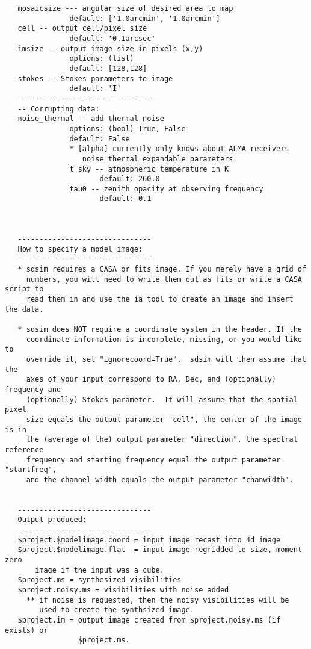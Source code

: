 \begin{verbatim}
   mosaicsize --- angular size of desired area to map
               default: ['1.0arcmin', '1.0arcmin']
   cell -- output cell/pixel size
               default: '0.1arcsec'
   imsize -- output image size in pixels (x,y)
               options: (list)
               default: [128,128]
   stokes -- Stokes parameters to image
               default: 'I'
   -------------------------------
   -- Corrupting data:
   noise_thermal -- add thermal noise 
               options: (bool) True, False
               default: False
               * [alpha] currently only knows about ALMA receivers 
                  noise_thermal expandable parameters
               t_sky -- atmospheric temperature in K 
                      default: 260.0
               tau0 -- zenith opacity at observing frequency
                      default: 0.1



   -------------------------------
   How to specify a model image:
   -------------------------------
   * sdsim requires a CASA or fits image. If you merely have a grid of 
     numbers, you will need to write them out as fits or write a CASA script to
     read them in and use the ia tool to create an image and insert the data.

   * sdsim does NOT require a coordinate system in the header. If the
     coordinate information is incomplete, missing, or you would like to
     override it, set "ignorecoord=True".  sdsim will then assume that the
     axes of your input correspond to RA, Dec, and (optionally) frequency and
     (optionally) Stokes parameter.  It will assume that the spatial pixel
     size equals the output parameter "cell", the center of the image is in
     the (average of the) output parameter "direction", the spectral reference
     frequency and starting frequency equal the output parameter "startfreq",
     and the channel width equals the output parameter "chanwidth".  


   -------------------------------
   Output produced:
   -------------------------------
   $project.$modelimage.coord = input image recast into 4d image
   $project.$modelimage.flat  = input image regridded to size, moment zero
       image if the input was a cube.
   $project.ms = synthesized visibilities
   $project.noisy.ms = visibilities with noise added 
     ** if noise is requested, then the noisy visibilities will be 
        used to create the synthsized image.
   $project.im = output image created from $project.noisy.ms (if exists) or
                 $project.ms. 
\end{verbatim}

